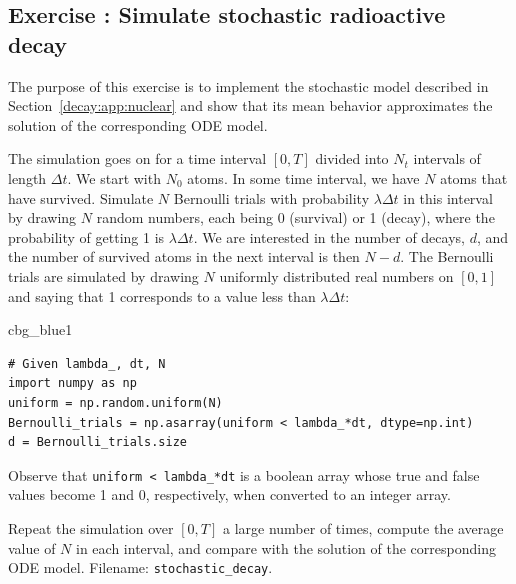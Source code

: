 \documentclass[%
oneside,                 %
final,                   %
10pt]{article}
\newenvironment{_cod_tight}[1]{
   \def\FrameCommand{\colorbox{#1}}
   \FrameRule0.6pt\MakeFramed {\FrameRestore}\vskip3mm}
   {\vskip0mm\endMakeFramed}
\newenvironment{cod}[1]{
\bgroup\rmfamily
\fboxsep=0mm\relax
\begin{_cod_tight}{#1}
\list{}{\parsep=-2mm\parskip=0mm\topsep=0pt\leftmargin=2mm
\rightmargin=2\leftmargin\leftmargin=4pt\relax}
\item\relax}
{\endlist\end{_cod_tight}\egroup}
\newenvironment{doconceexercise}{}{}
\newcounter{doconceexercisecounter}
\begin{document}
\begin{doconceexercise}

\subsection*{Exercise \thedoconceexercisecounter: Simulate stochastic radioactive decay}

\label{decay:app:exer:stoch:nuclear}

The purpose of this exercise is to implement the stochastic model
described in Section~\ref{decay:app:nuclear} and show that its
mean behavior approximates the solution of the corresponding
ODE model.

The simulation goes on for a time interval $[0,T]$ divided into
$N_t$ intervals of length $\Delta t$. We start with $N_0$
atoms. In some time interval, we have $N$ atoms that have survived.
Simulate $N$ Bernoulli trials with probability $\lambda\Delta t$
in this interval by drawing $N$ random numbers, each being 0 (survival)
or 1 (decay), where the probability of getting 1 is $\lambda\Delta t$.
We are interested in the number of decays, $d$, and the number of
survived atoms in the next interval is then $N-d$.
The Bernoulli trials
are simulated by drawing $N$ uniformly distributed real numbers on
$[0,1]$ and saying that 1 corresponds to a value less than $\lambda\Delta t$:

\begin{cod}{cbg_blue1}\begin{Verbatim}[numbers=none,fontsize=\fontsize{9pt}{9pt},baselinestretch=0.95,xleftmargin=2mm]
# Given lambda_, dt, N
import numpy as np
uniform = np.random.uniform(N)
Bernoulli_trials = np.asarray(uniform < lambda_*dt, dtype=np.int)
d = Bernoulli_trials.size
\end{Verbatim}
\end{cod}
\noindent
Observe that \Verb!uniform < lambda_*dt! is a boolean array whose true
and false values become 1 and 0, respectively, when converted to an
integer array.

Repeat the simulation over $[0,T]$ a large number of times, compute the average
value of $N$ in each interval, and compare with the solution of
the corresponding ODE model.
\noindent Filename: \Verb!stochastic_decay!.

\end{doconceexercise}
\end{document}
